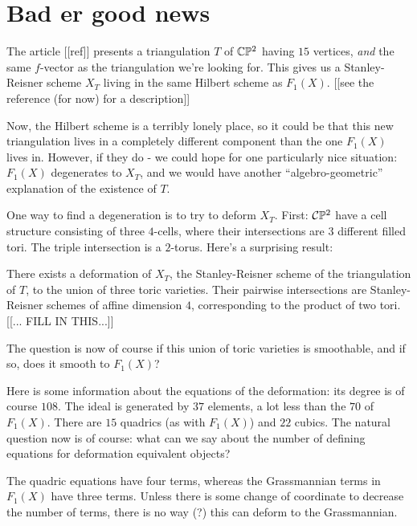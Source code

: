 \documentclass[11pt, english]{article}
\begin{document}
\section{Bad er good news}

The article [[ref]] presents a triangulation $T$ of $\mathbb{C} \mathbb{P}^2$ having $15$ vertices, \emph{and} the same $f$-vector as the triangulation we're looking for. This gives us a Stanley-Reisner scheme $X_T$ living in the same Hilbert scheme as $F_1(X)$. [[see the reference (for now) for a description]]

Now, the Hilbert scheme is a terribly lonely place, so it could be that this new triangulation lives in a completely different component than the one $F_1(X)$ lives in. However, if they do - we could hope for one particularly nice situation: $F_1(X)$ degenerates to $X_T$, and we would have another ``algebro-geometric'' explanation of the existence of $T$.

One way to find a degeneration is to try to deform $X_T$. First: $\mathcal{C} \mathbb{P}^2$ have a cell structure consisting of three $4$-cells, where their intersections are $3$ different filled tori. The triple intersection is a $2$-torus. Here's a surprising result:

\begin{prop}
 There exists a deformation of $X_T$, the Stanley-Reisner scheme of the triangulation of $T$, to the union of three toric varieties. Their pairwise intersections are Stanley-Reisner schemes of affine dimension $4$, corresponding to the product of two tori. [[... FILL IN THIS...]] 
\end{prop}

The question is now of course if this union of toric varieties is smoothable, and if so, does it smooth to $F_1(X)$? 

Here is some information about the equations of the deformation: its degree is of course $108$. The ideal is generated by $37$ elements, a lot less than the $70$ of $F_1(X)$. There are $15$ quadrics (as with $F_1(X)$) and $22$ cubics. The natural question now is of course: what can we say about the number of defining equations for deformation equivalent objects?

\begin{remark}
 The quadric equations have four terms, whereas the Grassmannian terms in $F_1(X)$ have three terms. Unless there is some change of coordinate to decrease the number of terms, there is no way (?) this can deform to the Grassmannian.
\end{remark}
\end{document}
